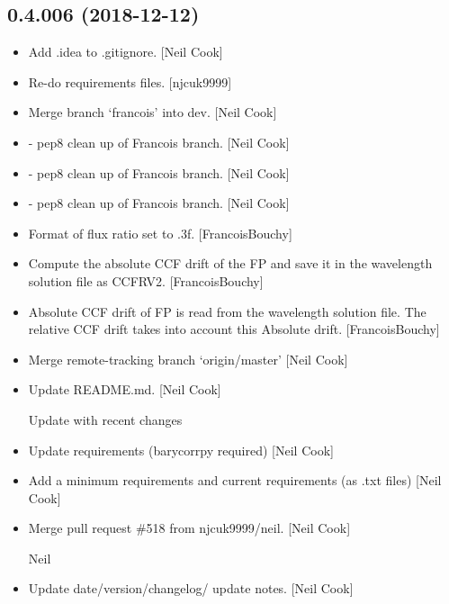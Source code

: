 \documentclass[a4paper,10pt,english]{report}
\begin{document}
\subsection{0.4.006 (2018-12-12)}
\label{\detokenize{misc/changelog:id238}}\begin{itemize}
\item {} 
Add .idea to .gitignore. {[}Neil Cook{]}

\item {} 
Re-do requirements files. {[}njcuk9999{]}

\item {} 
Merge branch ‘francois’ into dev. {[}Neil Cook{]}

\item {} 
 - pep8 clean up of Francois branch. {[}Neil
Cook{]}

\item {} 
 - pep8 clean up of Francois branch. {[}Neil
Cook{]}

\item {} 
 - pep8 clean up of Francois branch. {[}Neil
Cook{]}

\item {} 
Format of flux ratio set to .3f. {[}FrancoisBouchy{]}

\item {} 
Compute the absolute CCF drift of the FP and save it in the wavelength
solution file as CCFRV2. {[}FrancoisBouchy{]}

\item {} 
Absolute CCF drift of FP is read from the wavelength solution file.
The relative CCF drift takes into account this Absolute drift.
{[}FrancoisBouchy{]}

\item {} 
Merge remote-tracking branch ‘origin/master’ {[}Neil Cook{]}

\item {} 
Update README.md. {[}Neil Cook{]}

Update with recent changes

\item {} 
Update requirements (barycorrpy required) {[}Neil Cook{]}

\item {} 
Add a minimum requirements and current requirements (as .txt files)
{[}Neil Cook{]}

\item {} 
Merge pull request \#518 from njcuk9999/neil. {[}Neil Cook{]}

Neil

\item {} 
Update date/version/changelog/ update notes. {[}Neil Cook{]}

\end{itemize}
\end{document}
